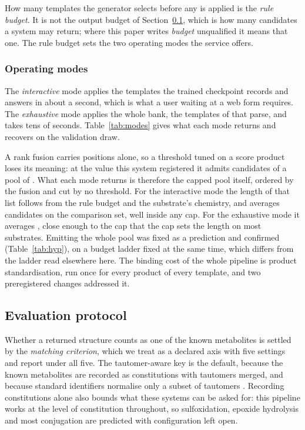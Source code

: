 How many templates the generator selects before any is applied is the \emph{rule budget}. It is not the output budget of Section~\ref{sec:evaluation}, which is how many candidates a system may return; where this paper writes \emph{budget} unqualified it means that one. The rule budget
sets the two operating modes the service offers.

\subsubsection{Operating modes}
\label{sec:modes}

The \emph{interactive} mode applies the \numHOneZeroTopk{} templates the trained checkpoint
records and answers in about a second, which is what a user waiting at a web form requires. The
\emph{exhaustive} mode applies the whole bank, the \numBankParses{} templates of
\numBankRules{} that parse, and takes tens of seconds. Table~\ref{tab:modes} gives what each mode
returns and recovers on the validation draw.



A rank fusion carries positions alone, so a threshold tuned on a score product loses its meaning: at the value this system registered it admits \numEmitByfusion{} candidates of a pool of \numEmitPool{}. What each mode returns is therefore the capped pool itself, ordered by the
fusion and cut by no threshold. For the interactive mode the length of that list follows from the
rule budget and the substrate's chemistry, and averages \numEmittedTrained{} candidates on the
comparison set, well inside any cap. For the exhaustive mode it averages \numEmittedBank{}, close
enough to the cap that the cap sets the length on most substrates. Emitting the whole pool was
fixed as a prediction and confirmed (Table~\ref{tab:hyp}), on a budget ladder fixed at the same
time, which differs from the ladder read elsewhere here. The binding cost of the whole
pipeline is product standardisation, run once for every product of every template, and two
preregistered changes addressed it.

\subsection{Evaluation protocol}
\label{sec:evaluation}

Whether a returned structure counts as one of the known metabolites is settled by the
\emph{matching criterion}, which we treat as a declared axis with five settings and report under
all five. The tautomer-aware key is the
default, because the known metabolites are recorded as constitutions with tautomers
merged, and because standard identifiers normalise only a subset of tautomers
\citep{Dhaked_2020}. Recording constitutions alone also bounds what these systems can be asked
for: this pipeline works at the level of constitution throughout, so sulfoxidation, epoxide
hydrolysis and most conjugation are predicted with configuration left open.


